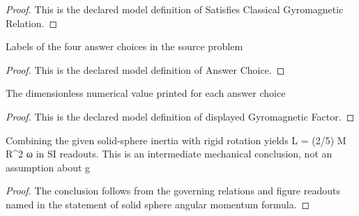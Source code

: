 \begin{proof}
  This is the declared model definition of Satisfies Classical Gyromagnetic Relation.
\end{proof}
\begin{definition}
  \label{def:physics:phyx-mini-0563:phyxminiproblems-problemphyxmini0563-answerchoice}
  Labels of the four answer choices in the source problem
\end{definition}
\begin{proof}
  This is the declared model definition of Answer Choice.
\end{proof}
\begin{definition}
  \label{def:physics:phyx-mini-0563:phyxminiproblems-problemphyxmini0563-displayedgyromagneticfactor}
  The dimensionless numerical value printed for each answer choice
\end{definition}
\begin{proof}
  This is the declared model definition of displayed Gyromagnetic Factor.
\end{proof}
\begin{lemma}
  \label{lem:physics:phyx-mini-0563:phyxminiproblems-problemphyxmini0563-solid-sphere-angular-momentum-formula}
  Combining the given solid-sphere inertia with rigid rotation yields L = (2/5) M R\textasciicircum{}2 ω in SI readouts. This is an intermediate mechanical conclusion, not an assumption about g
\end{lemma}
\begin{proof}
  The conclusion follows from the governing relations and figure readouts named in the statement of solid sphere angular momentum formula.
\end{proof}
